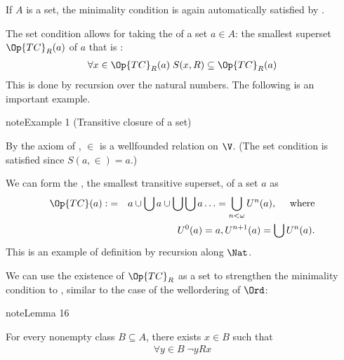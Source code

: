 \documentclass[letterpaper,10pt,english]{jupyterBook}
\begin{document}
\sphinxAtStartPar
If \(A\) is a set, the minimality condition is again automatically satisfied by .

\sphinxAtStartPar
The set condition allows for taking the  of a set \(a \in A\): the smallest superset \(\Op{TC}_R(a)\) of \(a\) that is :
\begin{equation*}
\begin{split} \forall x \in \Op{TC}_R(a)\; S(x,R) \subseteq  \Op{TC}_R(a)\end{split}
\end{equation*}
\sphinxAtStartPar
This is done by recursion over the natural numbers. The following is an important example.
\label{recursion:exa-trans-closure}
\begin{sphinxadmonition}{note}{Example 1 (Transitive closure of a set)}



\sphinxAtStartPar
By the axiom of , \(\in\) is a well\sphinxhyphen{}founded relation on \(\V\). (The set condition is satisfied since \(S(a,\in)=a\).)

\sphinxAtStartPar
We can form the , the smallest transitive superset, of a set \(a\) as
\begin{eqnarray*}
    \Op{TC}(a):&=& a \cup \bigcup a \cup \bigcup \bigcup a \ldots 
 = \bigcup_{n< \omega} U^n(a), \quad \text{ where} \\ 
 &&U^0(a) = a, U^{n+1}(a) = \bigcup U^n(a).
\end{eqnarray*}
\sphinxAtStartPar
This is an example of definition by recursion along \(\Nat\).
\end{sphinxadmonition}

\sphinxAtStartPar
We can use the existence of \(\Op{TC}_R\) as a set to strengthen the minimality condition to , similar to the case of the well\sphinxhyphen{}ordering of \(\Ord\):
\label{recursion:lem-min-wf}
\begin{sphinxadmonition}{note}{Lemma 16}



\sphinxAtStartPar
For every non\sphinxhyphen{}empty class \(B \subseteq A\), there exists \(x \in B\) such that
\begin{equation*}
\begin{split}
    \forall y \in B \;  \neg y R x
\end{split}
\end{equation*}\end{sphinxadmonition}
\end{document}
